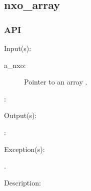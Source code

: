 %
%
%
%
%              

\subsection{nxo\_array}
\label{nxo_array}

\subsubsection{API}
\begin{capi}
\label{nxo_array_}
	\begin{capilist}
	\item[Input(s): ]
		\begin{description}\item[]
		\item[a\_nxo: ]
			Pointer to an array .
		\item[: ]
		\end{description}
	\item[Output(s): ]
		\begin{description}\item[]
		\item[: ]
		\end{description}
	\item[Exception(s): ]
		\begin{description}\item[]
		\item[.]
		\end{description}
	\item[Description: ]
	\end{capilist}
\end{capi}
